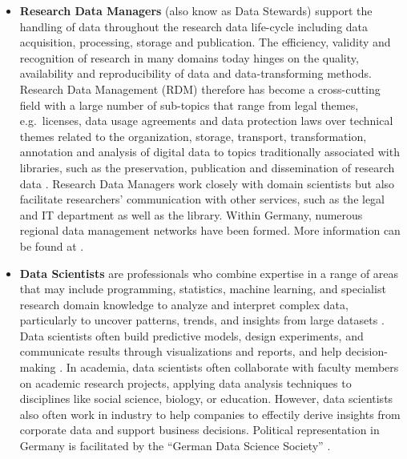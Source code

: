 \documentclass[
        english,biblatex
    ]{lni}
\begin{document}
    \begin{itemize}
    \item
      \textbf{Research Data Managers} (also know as Data Stewards)
      support the handling of data throughout the research data
      life-cycle including data acquisition, processing, storage and
      publication. The efficiency, validity and recognition of research
      in many domains today hinges on the quality, availability and
      reproducibility of data and data-transforming methods. Research
      Data Management (RDM) therefore has become a cross-cutting field
      with a large number of sub-topics that range from legal themes,
      e.g.~licenses, data usage agreements and data protection laws over
      technical themes related to the organization, storage, transport,
      transformation, annotation and analysis of digital data to topics
      traditionally associated with libraries, such as the preservation,
      publication and dissemination of research data
      \autocite{Gruber2021,Jetten2021}. Research Data Managers work
      closely with domain scientists but also facilitate researchers'
      communication with other services, such as the legal and IT
      department as well as the library. Within Germany, numerous
      regional data management networks have been formed. More
      information can be found at \cite{fdminfo}.
    \item
      \textbf{Data Scientists} are professionals who combine expertise
      in a range of areas that may include programming, statistics,
      machine learning, and specialist research domain knowledge to
      analyze and interpret complex data, particularly to uncover
      patterns, trends, and insights from large datasets
      \autocite{Steinmann2021Verzahnung}. Data scientists often build
      predictive models, design experiments, and communicate results
      through visualizations and reports, and help decision-making
      \autocite{George2016Big}. In academia, data scientists often
      collaborate with faculty members on academic research projects,
      applying data analysis techniques to disciplines like social
      science, biology, or education. However, data scientists also
      often work in industry to help companies to effectily derive
      insights from corporate data and support business decisions.
      Political representation in Germany is facilitated by the ``German
      Data Science Society'' \autocite{gds}.
    \end{itemize}
\end{document}
